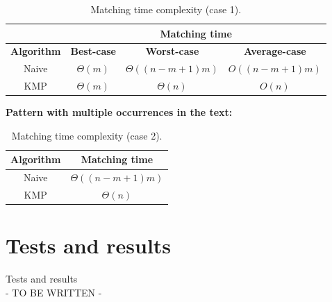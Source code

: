 \documentclass[11pt]{article}
\begin{document}
            \begin{table}[H]
                \centering
                    \begin{tabular}{|c|c|c|c|}
                        \hhline{~|---|}
                        \multicolumn{1}{c|}{}& \multicolumn{3}{c|}{\textbf{Matching time}} \\
                        \hline
                        \textbf{Algorithm} & \textbf{Best-case} & \textbf{Worst-case} & \textbf{Average-case} \\
                        \hline
                        Naive & $\Theta(m)$ & $\Theta((n-m+1)m)$ & $O((n-m+1)m)$ \\
                        \hline
                        KMP & $\Theta(m)$ & $\Theta(n)$ & $O(n)$ \\ %
                        \hline
                    \end{tabular}
                \caption{Matching time complexity (case 1).}
                \label{tab:matching_time_complexity_1}
            \end{table}


            \noindent \quad \textbf{Pattern with multiple occurrences in the text:}

            \begin{table}[H]
                \centering
                \begin{tabular}{|c|c|}
                    \hline
                    \textbf{Algorithm} & \textbf{Matching time} \\
                    \hline
                    Naive & $\Theta((n-m+1)m)$ \\
                    \hline
                    KMP & $\Theta(n)$ \\
                    \hline
                \end{tabular}
                \caption{Matching time complexity (case 2).}
                \label{tab:matching_time_complexity_2}
            \end{table}

    \section{Tests and results} \label{sec:tests_and_results}

        Tests and results \\
        - TO BE WRITTEN -
\end{document}
